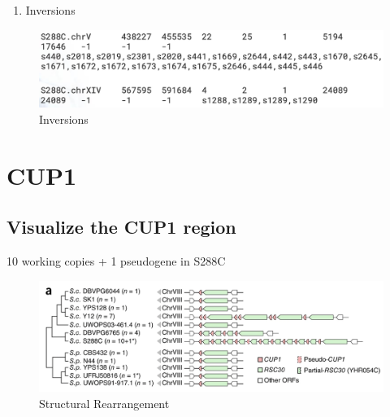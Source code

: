 \documentclass[
]{book}
\newenvironment{Shaded}{\begin{snugshade}}{\end{snugshade}}
\newcommand{\AttributeTok}[1]{\textcolor[rgb]{0.77,0.63,0.00}{#1}}
\newcommand{\FunctionTok}[1]{\textcolor[rgb]{0.00,0.00,0.00}{#1}}
\newcommand{\KeywordTok}[1]{\textcolor[rgb]{0.13,0.29,0.53}{\textbf{#1}}}
\newcommand{\NormalTok}[1]{#1}
\newcommand{\StringTok}[1]{\textcolor[rgb]{0.31,0.60,0.02}{#1}}
\providecommand{\tightlist}{%
  \setlength{\itemsep}{0pt}\setlength{\parskip}{0pt}}
\begin{document}
\begin{enumerate}
\def\labelenumi{\arabic{enumi}.}
\setcounter{enumi}{2}
\tightlist
\item
  Inversions
\end{enumerate}

\begin{Shaded}
\end{Shaded}

\begin{figure}
\centering
\includegraphics[width=1\textwidth,height=\textheight]{./Figures/Inversions.png}
\caption{Inversions}
\end{figure}

\hypertarget{cup1}{%
\section{CUP1}\label{cup1}}

\hypertarget{visualize-the-cup1-region}{%
\subsection*{Visualize the CUP1 region}\label{visualize-the-cup1-region}}

10 working copies + 1 pseudogene in S288C

\begin{figure}
\centering
\includegraphics[width=1\textwidth,height=\textheight]{./Figures/StructuralRearrangements.png}
\caption{Structural Rearrangement}
\end{figure}
\end{document}
